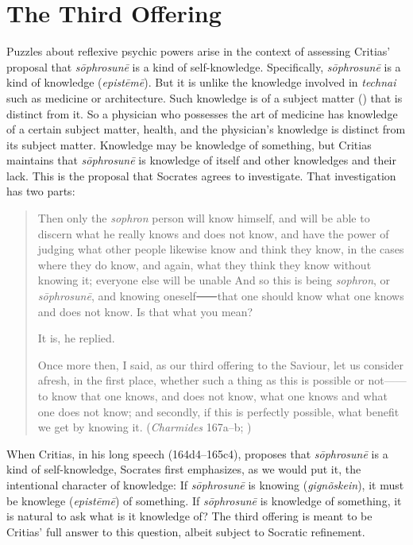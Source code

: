 
\section{The Third Offering} %
\label{sec:the_third_offering}

Puzzles about reflexive psychic powers arise in the context of assessing Critias' proposal that \emph{sōphrosunē} is a kind of self-knowledge. Specifically, \emph{sōphrosunē} is a kind of knowledge (\emph{epistēmē}). But it is unlike the knowledge involved in \emph{technai} such as medicine or architecture. Such knowledge is of a subject matter () that is distinct from it. So a physician who possesses the art of medicine has knowledge of a certain subject matter, health, and the physician's knowledge is distinct from its subject matter. Knowledge may be knowledge of something, but Critias maintains that \emph{sōphrosunē} is knowledge of itself and other knowledges and their lack. This is the proposal that Socrates agrees to investigate. That investigation has two parts:

\begin{quotation}
	Then only the \emph{sophron} person will know himself, and will be able to discern what he really knows and does not know, and have the power of judging what other people likewise know and think they know, in the cases where they do know, and again, what they think they know without knowing it; everyone else will be unable And so this is being \emph{sophron}, or \emph{sōphrosunē}, and knowing oneself⸺that one should know what one knows and does not know. Is that what you mean?
	
	It is, he replied.
	
	Once more then, I said, as our third offering to the Saviour, let us consider afresh, in the first place, whether such a thing as this is possible or not——to know that one knows, and does not know, what one knows and what one does not know; and secondly, if this is perfectly possible, what benefit we get by knowing it. (\emph{Charmides} 167a–b; \citealt[57]{Lamb:1927qw})
\end{quotation}

When Critias, in his long speech (164d4–165c4), proposes that \emph{sōphrosunē} is a kind of self-knowledge, Socrates first emphasizes, as we would put it, the intentional character of knowledge: If \emph{sōphrosunē} is knowing (\emph{gignõskein}), it must be knowlege (\emph{epistēmē}) of something. If \emph{sōphrosunē} is knowledge of something, it is natural to ask what is it knowledge of? The third offering is meant to be Critias' full answer to this question, albeit subject to Socratic refinement.

